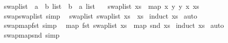 \begin{isabellebody}
\isamarkupfalse%
\ swap{\isacharunderscore}{\kern0pt}list\ {\isacharcolon}{\kern0pt}{\isacharcolon}{\kern0pt}\ {\isachardoublequoteopen}{\isacharparenleft}{\kern0pt}{\isacharprime}{\kern0pt}a\ {\isacharasterisk}{\kern0pt}\ {\isacharprime}{\kern0pt}b{\isacharparenright}{\kern0pt}\ list\ {\isacharequal}{\kern0pt}{\isachargreater}{\kern0pt}\ {\isacharparenleft}{\kern0pt}{\isacharprime}{\kern0pt}b\ {\isacharasterisk}{\kern0pt}\ {\isacharprime}{\kern0pt}a{\isacharparenright}{\kern0pt}\ list{\isachardoublequoteclose}\isanewline
\ \ \ {\isachardoublequoteopen}swap{\isacharunderscore}{\kern0pt}list\ xs\ {\isasymequiv}\ map\ {\isacharparenleft}{\kern0pt}{\isasymlambda}{\isacharparenleft}{\kern0pt}x{\isacharcomma}{\kern0pt}\ y{\isacharparenright}{\kern0pt}{\isachardot}{\kern0pt}\ {\isacharparenleft}{\kern0pt}y{\isacharcomma}{\kern0pt}\ x{\isacharparenright}{\kern0pt}{\isacharparenright}{\kern0pt}\ xs{\isachardoublequoteclose}\isanewline
\isanewline
{}\isamarkupfalse%
\ swap{\isacharunderscore}{\kern0pt}swap{\isacharunderscore}{\kern0pt}list\ {\isacharbrackleft}{\kern0pt}simp{\isacharbrackright}{\kern0pt}{\isacharcolon}{\kern0pt}\isanewline
\ \ {\isachardoublequoteopen}swap{\isacharunderscore}{\kern0pt}list\ {\isacharparenleft}{\kern0pt}swap{\isacharunderscore}{\kern0pt}list\ xs{\isacharparenright}{\kern0pt}\ {\isacharequal}{\kern0pt}\ xs{\isachardoublequoteclose}\isanewline
%
\isadelimproof
%
\endisadelimproof
%
\isatagproof
{}\isamarkupfalse%
\ {\isacharparenleft}{\kern0pt}induct\ xs{\isacharparenright}{\kern0pt}\isanewline
{}\isamarkupfalse%
\ auto%
\endisatagproof
{\isafoldproof}%
%
\isadelimproof
\isanewline
%
\endisadelimproof
\isanewline
{}\isamarkupfalse%
\ swap{\isacharunderscore}{\kern0pt}map{\isacharunderscore}{\kern0pt}fst\ {\isacharbrackleft}{\kern0pt}simp{\isacharbrackright}{\kern0pt}{\isacharcolon}{\kern0pt}\isanewline
\ \ {\isachardoublequoteopen}map\ fst\ {\isacharparenleft}{\kern0pt}swap{\isacharunderscore}{\kern0pt}list\ xs{\isacharparenright}{\kern0pt}\ {\isacharequal}{\kern0pt}\ map\ snd\ xs{\isachardoublequoteclose}\isanewline
%
\isadelimproof
%
\endisadelimproof
%
\isatagproof
{}\isamarkupfalse%
\ {\isacharparenleft}{\kern0pt}induct\ xs{\isacharparenright}{\kern0pt}\isanewline
{}\isamarkupfalse%
\ auto%
\endisatagproof
{\isafoldproof}%
%
\isadelimproof
\isanewline
%
\endisadelimproof
\isanewline
\isanewline
{}\isamarkupfalse%
\ swap{\isacharunderscore}{\kern0pt}map{\isacharunderscore}{\kern0pt}snd\ {\isacharbrackleft}{\kern0pt}simp{\isacharbrackright}{\kern0pt}{\isacharcolon}{\kern0pt}\isanewline

\end{isabellebody}
